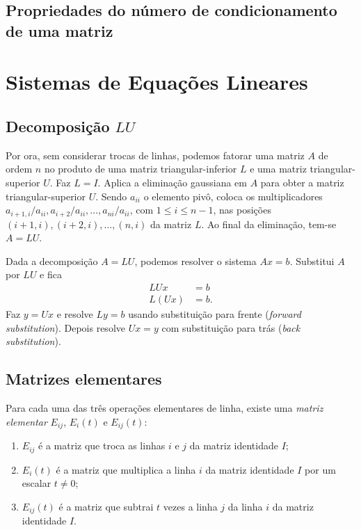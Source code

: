 \documentclass{article}
\begin{document}
\subsection{Propriedades do número de condicionamento de uma matriz}

\section{Sistemas de Equações Lineares}

\subsection{Decomposição \(LU\)}

Por ora, sem considerar trocas de linhas, podemos fatorar uma matriz \(A\) de ordem \(n\) no produto de uma matriz triangular-inferior \(L\) e uma matriz triangular-superior \(U\). Faz \(L=I\). Aplica a eliminação gaussiana em \(A\) para obter a matriz triangular-superior \(U\). Sendo \(a_{ii}\) o elemento pivô, coloca os multiplicadores \(a_{i+1,i}/a_{ii},a_{i+2}/a_{ii},\ldots,a_{ni}/a_{ii}\), com \(1\leq i \leq n-1\), nas posições \((i+1,i),(i+2,i),\ldots,(n,i)\) da matriz \(L\). Ao final da eliminação, tem-se \(A=LU\).

Dada a decomposição \(A=LU\), podemos resolver o sistema \(Ax=b\). Substitui \(A\) por \(LU\) e fica
\begin{align}
    LUx&=b\\
    L(Ux)&=b.
\end{align}
Faz \(y=Ux\) e resolve \(Ly=b\) usando substituição para frente (\emph{forward substitution}). Depois resolve \(Ux=y\) com substituição para trás (\emph{back substitution}).

\subsection{Matrizes elementares}

\begin{defn}
    Para cada uma das três operações elementares de linha, existe uma \emph{matriz elementar} \(E_{ij}\), \(E_{i}(t)\) e \(E_{ij}(t)\):
    \begin{enumerate}
        \item \(E_{ij}\) é a matriz que troca as linhas \(i\) e \(j\) da matriz identidade \(I\);
        \item \(E_i(t)\) é a matriz que multiplica a linha \(i\) da matriz identidade \(I\) por um escalar \(t \neq 0\);
        \item \(E_{ij}(t)\) é a matriz que subtrai \(t\) vezes a linha \(j\) da linha \(i\) da matriz identidade \(I\).
    \end{enumerate}
\end{defn}
\end{document}
